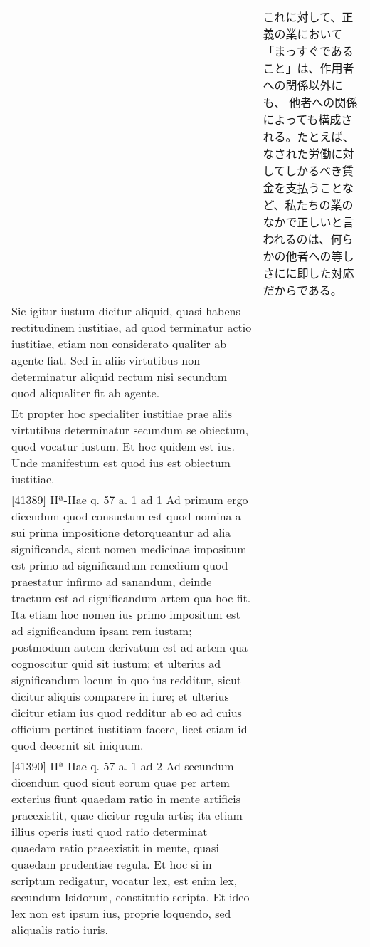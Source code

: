 \documentclass[10pt]{jsarticle} %
\begin{document}
\begin{longtable}{p{21em}p{21em}}
&

これに対して、正義の業において「まっすぐであること」は、作用者への関係以外にも、
 他者への関係によっても構成される。たとえば、なされた労働に対してしかるべき賃金を支払うことなど、私たちの業のなかで正しいと言われるのは、何らかの他者への等しさにに即した対応だからである。



\\



Sic igitur iustum dicitur aliquid, quasi habens
 rectitudinem iustitiae, ad quod terminatur actio iustitiae, etiam non
 considerato qualiter ab agente fiat. Sed in aliis virtutibus non
 determinatur aliquid rectum nisi secundum quod aliqualiter fit ab
 agente. 



&


\\



Et propter hoc specialiter iustitiae prae aliis virtutibus
 determinatur secundum se obiectum, quod vocatur iustum. Et hoc quidem
 est ius. Unde manifestum est quod ius est obiectum iustitiae.


&


\\



[41389] IIª-IIae q. 57 a. 1 ad 1 Ad primum ergo dicendum quod consuetum est quod nomina a sui prima impositione detorqueantur ad alia significanda, sicut nomen medicinae impositum est primo ad significandum remedium quod praestatur infirmo ad sanandum, deinde tractum est ad significandum artem qua hoc fit. Ita etiam hoc nomen ius primo impositum est ad significandum ipsam rem iustam; postmodum autem derivatum est ad artem qua cognoscitur quid sit iustum; et ulterius ad significandum locum in quo ius redditur, sicut dicitur aliquis comparere in iure; et ulterius dicitur etiam ius quod redditur ab eo ad cuius officium pertinet iustitiam facere, licet etiam id quod decernit sit iniquum.

&


\\



[41390] IIª-IIae q. 57 a. 1 ad 2 Ad secundum dicendum quod sicut eorum quae per artem exterius fiunt quaedam ratio in mente artificis praeexistit, quae dicitur regula artis; ita etiam illius operis iusti quod ratio determinat quaedam ratio praeexistit in mente, quasi quaedam prudentiae regula. Et hoc si in scriptum redigatur, vocatur lex, est enim lex, secundum Isidorum, constitutio scripta. Et ideo lex non est ipsum ius, proprie loquendo, sed aliqualis ratio iuris.


\end{longtable}
\end{document}
